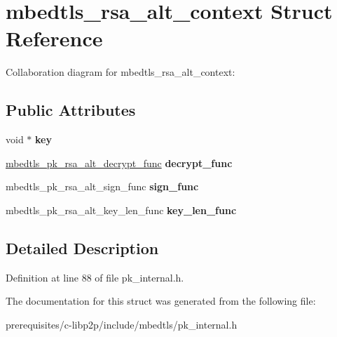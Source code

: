 \hypertarget{structmbedtls__rsa__alt__context}{}\section{mbedtls\+\_\+rsa\+\_\+alt\+\_\+context Struct Reference}
\label{structmbedtls__rsa__alt__context}


Collaboration diagram for mbedtls\+\_\+rsa\+\_\+alt\+\_\+context\+:
\subsection*{Public Attributes}
\begin{DoxyCompactItemize}
\item 
\mbox{\label{structmbedtls__rsa__alt__context_a3401cfe1ad6eda2011b67550b75c6cbe}} 
void $\ast$ {\bfseries key}
\item 
\mbox{\label{structmbedtls__rsa__alt__context_a9aeee8e7912780a2858957c6e9029190}} 
\mbox{\hyperlink{pk_8h_a01453ce20b7a8d47aaecd90ef9997e24}{mbedtls\+\_\+pk\+\_\+rsa\+\_\+alt\+\_\+decrypt\+\_\+func}} {\bfseries decrypt\+\_\+func}
\item 
\mbox{\label{structmbedtls__rsa__alt__context_ac7ab4c3b43c032b0dd1dec664970594b}} 
mbedtls\+\_\+pk\+\_\+rsa\+\_\+alt\+\_\+sign\+\_\+func {\bfseries sign\+\_\+func}
\item 
\mbox{\label{structmbedtls__rsa__alt__context_a5e93d75e2177a223d7909c426b85dac2}} 
mbedtls\+\_\+pk\+\_\+rsa\+\_\+alt\+\_\+key\+\_\+len\+\_\+func {\bfseries key\+\_\+len\+\_\+func}
\end{DoxyCompactItemize}


\subsection{Detailed Description}


Definition at line 88 of file pk\+\_\+internal.\+h.



The documentation for this struct was generated from the following file\+:\begin{DoxyCompactItemize}
\item 
prerequisites/c-\/libp2p/include/mbedtls/pk\+\_\+internal.\+h\end{DoxyCompactItemize}
